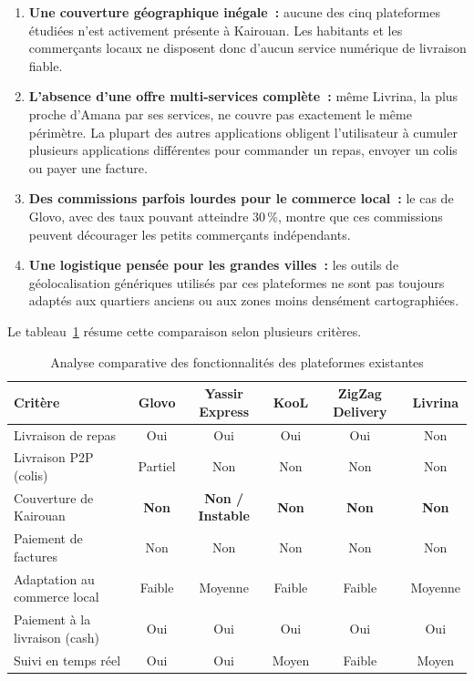 \documentclass[12pt,fleqn,a4paper]{report}
\begin{document}
\begin{justify}
\begin{enumerate}
    \item \textbf{Une couverture géographique inégale~:} aucune des cinq plateformes étudiées n'est activement présente à Kairouan. Les habitants et les commerçants locaux ne disposent donc d'aucun service numérique de livraison fiable.
    \item \textbf{L'absence d'une offre multi-services complète~:} même Livrina, la plus proche d'Amana par ses services, ne couvre pas exactement le même périmètre. La plupart des autres applications obligent l'utilisateur à cumuler plusieurs applications différentes pour commander un repas, envoyer un colis ou payer une facture.
    \item \textbf{Des commissions parfois lourdes pour le commerce local~:} le cas de Glovo, avec des taux pouvant atteindre 30\,\%, montre que ces commissions peuvent décourager les petits commerçants indépendants.
    \item \textbf{Une logistique pensée pour les grandes villes~:} les outils de géolocalisation génériques utilisés par ces plateformes ne sont pas toujours adaptés aux quartiers anciens ou aux zones moins densément cartographiées.
\end{enumerate}

Le tableau~\ref{tab:comparatif_existant} résume cette comparaison selon plusieurs critères.

\begin{table}[h!]
\centering
\scriptsize
\setlength{\tabcolsep}{3pt}
\renewcommand{\arraystretch}{1.25}
\begin{tabular}{|l|c|c|c|c|c|}
\hline
\textbf{Critère} & \textbf{Glovo} & \textbf{Yassir Express} & \textbf{KooL} & \textbf{ZigZag Delivery} & \textbf{Livrina} \\ \hline
Livraison de repas & Oui & Oui & Oui & Oui & Non \\ \hline
Livraison P2P (colis) & Partiel & Non & Non & Non & Non \\ \hline
Couverture de Kairouan & \textbf{Non} & \textbf{Non / Instable} & \textbf{Non} & \textbf{Non} & \textbf{Non} \\ \hline
Paiement de factures & Non & Non & Non & Non & Non \\ \hline
Adaptation au commerce local & Faible & Moyenne & Faible & Faible & Moyenne \\ \hline
Paiement à la livraison (cash) & Oui & Oui & Oui & Oui & Oui \\ \hline
Suivi en temps réel & Oui & Oui & Moyen & Faible & Moyen \\ \hline
\end{tabular}
\caption{Analyse comparative des fonctionnalités des plateformes existantes}
\label{tab:comparatif_existant}
\end{table}


\end{justify}
\end{document}
